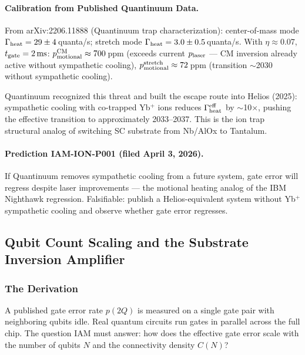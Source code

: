 \documentclass[12pt,a4paper]{article}
\begin{document}
\paragraph{Calibration from Published Quantinuum Data.}

From arXiv:2206.11888 (Quantinuum trap characterization):
center-of-mass mode $\Gamma_{\rm heat} = 29 \pm 4$\,quanta/s;
stretch mode $\Gamma_{\rm heat} = 3.0 \pm 0.5$\,quanta/s.
With $\eta \approx 0.07$, $t_{\rm gate} = 2\,{\rm ms}$:
$p_{\rm motional}^{\rm CM} \approx 700$\,ppm (exceeds current $p_{\rm laser}$
--- CM inversion already active without sympathetic cooling),
$p_{\rm motional}^{\rm stretch} \approx 72$\,ppm (transition $\sim$2030
without sympathetic cooling).

Quantinuum recognized this threat and built the escape route into Helios
(2025): sympathetic cooling with co-trapped Yb$^+$ ions reduces
$\Gamma_{\rm heat}^{\rm eff}$ by $\sim$10$\times$, pushing the effective
transition to approximately 2033--2037. This is the ion trap structural
analog of switching SC substrate from Nb/AlOx to Tantalum.

\paragraph{Prediction IAM-ION-P001 (filed April 3, 2026).}

If Quantinuum removes sympathetic cooling from a future system,
gate error will regress despite laser improvements ---
the motional heating analog of the IBM Nighthawk regression.
Falsifiable: publish a Helios-equivalent system without Yb$^+$
sympathetic cooling and observe whether gate error regresses.



\subsection{Qubit Count Scaling and the Substrate Inversion Amplifier}
\label{sec:scaling_law}

\subsubsection{The Derivation}

A published gate error rate $p(2Q)$ is measured on a single gate pair with
neighboring qubits idle. Real quantum circuits run gates in parallel across
the full chip. The question IAM must answer: how does the effective gate error
scale with the number of qubits $N$ and the connectivity density $C(N)$?
\end{document}
